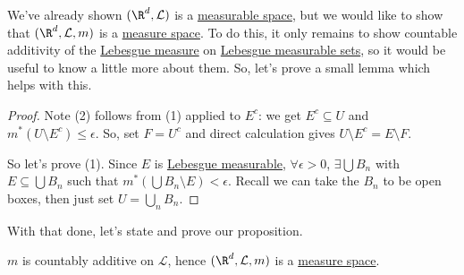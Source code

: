 \documentclass{article}
\newcommand{\1}[1]{\mathbbm{1}_{#1}}
\begin{document}
We've already shown $(\R^d, \mathcal{L})$ is a \hyperlink{def:measurableSpace}{measurable space}, but we would like to show that $(\R^d, \mathcal{L}, m)$ is a \hyperlink{def:measureSpace}{measure space}.
To do this, it only remains to show countable additivity of the \hyperlink{def:lebMeas}{Lebesgue measure} on \hyperlink{def:lebMAble}{Lebesgue measurable sets}, so it would be useful to know a little more about them.
So, let's prove a small lemma which helps with this.


\begin{proof}
    Note (2) follows from (1) applied to $E^c$: we get $E^c \subseteq U$ and $m^*(U \setminus E^c) \leq \epsilon$.
    So, set $F = U^c$ and direct calculation gives $U \setminus E^c = E \setminus F$.

    So let's prove (1). Since $E$ is \hyperlink{def:lebMAble}{Lebesgue measurable}, $\forall \epsilon > 0$, $\exists\bigcup B_n$ with $E \subseteq \bigcup B_n$ such that $m^*(\bigcup B_n \setminus E) < \epsilon$.
    Recall we can take the $B_n$ to be open boxes, then just set $U  = \bigcup_n B_n$.
\end{proof}

With that done, let's state and prove our proposition.

\begin{prop}
    \hyperlink{def:lebMeas}{$m$} is countably additive on $\mathcal{L}$, hence $(\R^d, \mathcal{L}, m)$ is a \hyperlink{def:measureSpace}{measure space}.
\end{prop}
\end{document}
